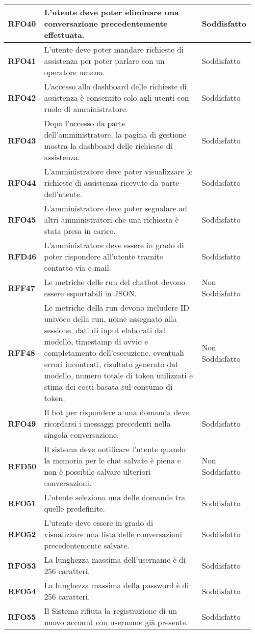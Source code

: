 \begin{longtable}{|>{\centering\arraybackslash}m{}|>{\centering\arraybackslash}m{}|>{\centering\arraybackslash}m{}|}
    \hline
    \textbf{RFO40} & L'utente deve poter eliminare una conversazione precedentemente effettuata. & Soddisfatto \\
    \hline
    \textbf{RFO41} & L'utente deve poter mandare richieste di assistenza per poter parlare con un operatore umano. & Soddisfatto \\
    \hline
    \textbf{RFO42} & L’accesso alla dashboard delle richieste di assistenza è consentito solo agli utenti con ruolo di amministratore. & Soddisfatto \\
    \hline
    \textbf{RFO43} & Dopo l’accesso da parte dell'amministratore, la pagina di gestione mostra la dashboard delle richieste di assistenza. & Soddisfatto \\
    \hline
    \textbf{RFO44} & L'amministratore deve poter visualizzare le richieste di assistenza ricevute da parte dell'utente. & Soddisfatto \\
    \hline
    \textbf{RFO45} & L'amministratore deve poter segnalare ad altri amministratori che una richiesta è stata presa in carico. & Soddisfatto \\
    \hline
    \textbf{RFD46} & L'amministratore deve essere in grado di poter rispondere all'utente tramite contatto via e-mail. & Soddisfatto \\
    \hline
    \textbf{RFF47} & Le metriche delle run del chatbot devono essere esportabili in JSON. & Non Soddisfatto \\
    \hline
    \textbf{RFF48} & Le metriche della run devono includere ID univoco della run, nome assegnato alla sessione, dati di input elaborati dal modello, timestamp di avvio e completamento dell'esecuzione, eventuali errori incontrati, risultato generato dal modello, numero totale di token utilizzati e stima dei costi basata sul consumo di token. & Non Soddisfatto \\
    \hline
    \textbf{RFO49} & Il bot per rispondere a una domanda deve ricordarsi i messaggi precedenti nella singola conversazione. & Soddisfatto \\
    \hline
    \textbf{RFD50} & Il sistema deve notificare l'utente quando la memoria per le chat salvate è piena e non è possibile salvare ulteriori conversazioni. & Non Soddisfatto \\
    \hline
    \textbf{RFO51} & L'utente seleziona una delle domande tra quelle predefinite. & Soddisfatto \\
    \hline
    \textbf{RFO52} & L'utente deve essere in grado di visualizzare una lista delle conversazioni precedentemente salvate. & Soddisfatto \\
    \hline
    \textbf{RFO53} & La lunghezza massima dell'username è di 256 caratteri. & Soddisfatto \\
    \hline
    \textbf{RFO54} & La lunghezza massima della password è di 256 caratteri. & Soddisfatto \\
    \hline
    \textbf{RFO55} & Il Sistema rifiuta la registrazione di un nuovo account con username già presente. & Soddisfatto \\
    \hline


\end{longtable}
